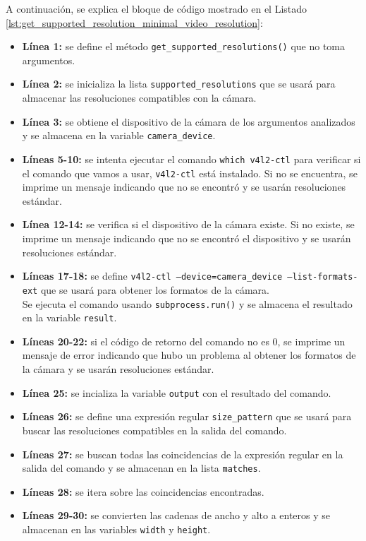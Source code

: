 A continuación, se explica el bloque de código mostrado en el Listado \ref{lst:get_supported_resolution_minimal_video_resolution}:
\begin{itemize}
    \item \textbf{Línea 1:} se define el método \texttt{get\_supported\_resolutions()} que no toma argumentos.
    \item \textbf{Línea 2:} se inicializa la lista \texttt{supported\_resolutions} que se usará para almacenar las resoluciones compatibles con la cámara.
    \item \textbf{Línea 3:} se obtiene el dispositivo de la cámara de los argumentos analizados y se almacena en la variable \texttt{camera\_device}.
    \item \textbf{Líneas 5-10:} se intenta ejecutar el comando \texttt{which v4l2-ctl} para verificar si el comando que vamos a usar, \texttt{v4l2-ctl} está instalado. Si no se encuentra, se imprime un mensaje indicando que no se encontró y se usarán resoluciones estándar.
    \item \textbf{Línea 12-14:} se verifica si el dispositivo de la cámara existe. Si no existe, se imprime un mensaje indicando que no se encontró el dispositivo y se usarán resoluciones estándar.
    \item \textbf{Líneas 17-18:} se define \texttt{v4l2-ctl --device=camera\_device --list-formats-ext} que se usará para obtener los formatos de la cámara. \\
    Se ejecuta el comando usando \texttt{subprocess.run()} y se almacena el resultado en la variable \texttt{result}.
    \item \textbf{Líneas 20-22:} si el código de retorno del comando no es 0, se imprime un mensaje de error indicando que hubo un problema al obtener los formatos de la cámara y se usarán resoluciones estándar.
    \item \textbf{Línea 25:} se incializa la variable \texttt{output} con el resultado del comando.
    \item \textbf{Líneas 26:} se define una expresión regular \texttt{size\_pattern} que se usará para buscar las resoluciones compatibles en la salida del comando.
    \item \textbf{Líneas 27:} se buscan todas las coincidencias de la expresión regular en la salida del comando y se almacenan en la lista \texttt{matches}.
    \item \textbf{Líneas 28:} se itera sobre las coincidencias encontradas.
    \item \textbf{Líneas 29-30:} se convierten las cadenas de ancho y alto a enteros y se almacenan en las variables \texttt{width} y \texttt{height}.

\end{itemize}
